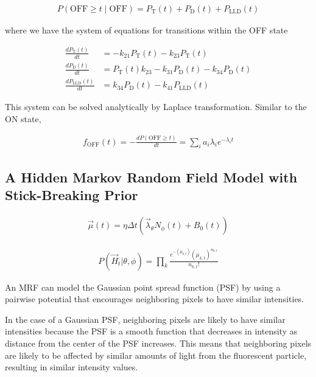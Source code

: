 \documentclass{ucetd}
\begin{document}
\begin{align*}
P(\mathrm{OFF} \geq t\; | \; \mathrm{OFF}) = P_{\mathrm{T}}(t) + P_{\mathrm{D}}(t) + P_{\mathrm{LLD}}(t)
\end{align*}

where we have the system of equations for transitions within the OFF state

\begin{align*}
\frac{dP_{\mathrm{T}}(t)}{dt} &= -k_{21}P_{\mathrm{T}}(t) - k_{23}P_{\mathrm{T}}(t)\\
\frac{dP_{\mathrm{D}}(t)}{dt} &= P_{\mathrm{T}}(t)k_{23}-k_{31}P_{\mathrm{D}}(t) - k_{34}P_{\mathrm{D}}(t)\\
\frac{dP_{\mathrm{LLD}}(t)}{dt} &= k_{34}P_{\mathrm{D}}(t) - k_{41}P_{\mathrm{LLD}}(t)
\end{align*}

This system can be solved analytically by Laplace transformation. Similar to the ON state, 

\begin{align*}
f_{\mathrm{OFF}}(t) = -\frac{dP(\mathrm{OFF} \geq t)}{dt} = \sum_{i}a_{i}\lambda_{i}e^{-\lambda_{i}t}
\end{align*}

\subsection{A Hidden Markov Random Field Model with Stick-Breaking Prior}

\begin{align*}
\vec{\mu}(t) = \eta\Delta t\left(\vec{\lambda}_{\theta}N_{\phi}(t) + B_{0}(t)\right)
\end{align*}

\begin{align*}
P(\vec{H}_{t}|\theta,\phi) = \prod_{k} \frac{e^{-\left(\mu_{k,t}\right)}\left(\mu_{k,t}\right)^{n_{k,t}}}{n_{k,t}!}
\end{align*}

An MRF can model the Gaussian point spread function (PSF) by using a pairwise potential that encourages neighboring pixels to have similar intensities.

In the case of a Gaussian PSF, neighboring pixels are likely to have similar intensities because the PSF is a smooth function that decreases in intensity as distance from the center of the PSF increases. This means that neighboring pixels are likely to be affected by similar amounts of light from the fluorescent particle, resulting in similar intensity values.
\end{document}
